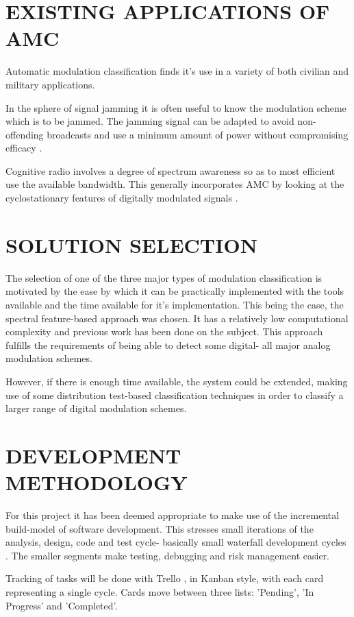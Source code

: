 \documentclass[10pt,onecolumn]{witseiepaper}
\begin{document}
\begin{multicols}{2}
\section{EXISTING APPLICATIONS OF AMC}
Automatic modulation classification finds it's use in a variety of both civilian and military applications. 

In the sphere of signal jamming it is often useful to know the modulation scheme which is to be jammed. The jamming signal can be adapted to avoid non-offending broadcasts and use a minimum amount of power without compromising efficacy \cite{azzouz2013automatic}.

Cognitive radio involves a degree of spectrum awareness so as to most efficient use the available bandwidth\cite{kim2007cyclostationary}. This generally incorporates AMC by looking at the cyclostationary features of digitally modulated signals \cite{kim2007cyclostationary}.




\section{SOLUTION SELECTION}
	The selection of one of the three major types of modulation classification is motivated by the ease by which it can be practically implemented with the tools available and the time available for it's implementation. 
	This being the case, the spectral feature-based approach was chosen. It has a relatively low computational complexity and previous work has been done on the subject. This approach fulfills the requirements of being able to detect some digital- all major analog modulation schemes.

	However, if there is enough time available, the system could be extended, making use of some distribution test-based classification techniques in order to classify a larger range of digital modulation schemes.

\section{DEVELOPMENT METHODOLOGY} 
	For this project it has been deemed appropriate to make use of the incremental build-model of software development. This stresses small iterations of the analysis, design, code and test cycle- basically small waterfall development cycles \cite{incremental_model, waterfall_model}. The smaller segments make testing, debugging and risk management easier.

	Tracking of tasks will be done with Trello \cite{trello}, in Kanban style, with each card representing a single cycle\cite{kanban_model}. Cards move between three lists: 'Pending', 'In Progress' and 'Completed'.


\end{multicols}
\end{document}
